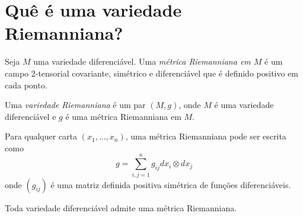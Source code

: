 
\cite{Lee2012}
\cite{Lee1997}
\cite{Carmo1988}



\section{Quê é uma variedade Riemanniana?}

\begin{definicao}
	Seja $M$ uma variedade diferenciável. Uma \emph{métrica Riemanniana em $M$} é um campo 2-tensorial covariante, simétrico e diferenciável que é definido positivo em cada ponto.	
\end{definicao}

\begin{definicao}
	Uma \emph{variedade Riemanniana} é um par $(M,g)$, onde $M$ é uma variedade diferenciável e $g$ é uma métrica Riemanniana em $M$.
\end{definicao}

\begin{observacao}
	Para qualquer carta $(x_1, \ldots, x_n)$, uma métrica Riemanniana pode ser escrita como
	\begin{equation*}
		g = \sum_{i,j=1}^n g_{ij} dx_i \otimes dx_j
	\end{equation*}
	onde $(g_{ij})$ é uma matriz definida positiva simétrica de funções diferenciáveis.
\end{observacao}

\begin{proposicao}
Toda variedade diferenciável admite uma métrica Riemanniana.
\end{proposicao}


